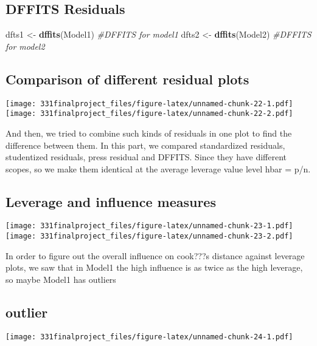 \documentclass[]{article}
\newenvironment{Shaded}{\begin{snugshade}}{\end{snugshade}}
\newcommand{\KeywordTok}[1]{\textcolor[rgb]{0.13,0.29,0.53}{\textbf{#1}}}
\newcommand{\StringTok}[1]{\textcolor[rgb]{0.31,0.60,0.02}{#1}}
\newcommand{\CommentTok}[1]{\textcolor[rgb]{0.56,0.35,0.01}{\textit{#1}}}
\newcommand{\NormalTok}[1]{#1}
\begin{document}
\subsection{DFFITS Residuals}\label{dffits-residuals}

\begin{Shaded}
\begin{Highlighting}[]
\NormalTok{dfts1 <-}\StringTok{ }\KeywordTok{dffits}\NormalTok{(Model1) }\CommentTok{#DFFITS for model1}
\NormalTok{dfts2 <-}\StringTok{ }\KeywordTok{dffits}\NormalTok{(Model2) }\CommentTok{#DFFITS for model2}
\end{Highlighting}
\end{Shaded}

\subsection{Comparison of different residual
plots}\label{comparison-of-different-residual-plots}

\texttt{[image: 331finalproject\_files/figure-latex/unnamed-chunk-22-1.pdf]}
\texttt{[image: 331finalproject\_files/figure-latex/unnamed-chunk-22-2.pdf]}

And then, we tried to combine such kinds of residuals in one plot to
find the difference between them. In this part, we compared standardized
residuals, studentized residuals, press residual and DFFITS. Since they
have different scopes, so we make them identical at the average leverage
value level hbar = p/n.

\subsection{Leverage and influence
measures}\label{leverage-and-influence-measures}

\texttt{[image: 331finalproject\_files/figure-latex/unnamed-chunk-23-1.pdf]}
\texttt{[image: 331finalproject\_files/figure-latex/unnamed-chunk-23-2.pdf]}

In order to figure out the overall influence on cook???s distance
against leverage plots, we saw that in Model1 the high influence is as
twice as the high leverage, so maybe Model1 has outliers

\subsection{outlier}\label{outlier}

\texttt{[image: 331finalproject\_files/figure-latex/unnamed-chunk-24-1.pdf]}
\end{document}
